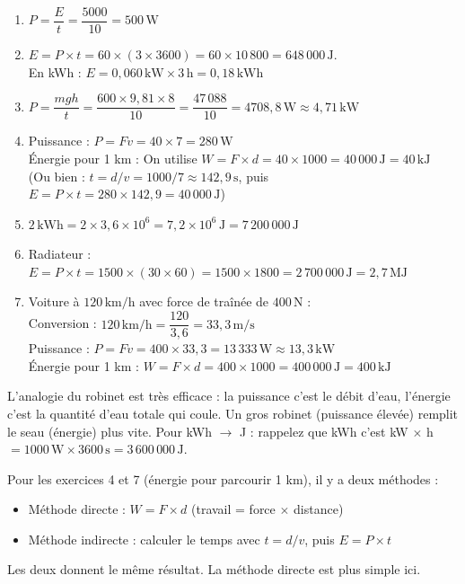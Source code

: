 \documentclass[11pt,a4paper]{article}
\newcommand{\corrbox}[1]{
\begin{tcolorbox}[colback=correctgreen!8!white,colframe=correctgreen!60!black]
#1
\end{tcolorbox}
}
\newcommand{\tipbox}[1]{
\begin{tcolorbox}[colback=tipblue!8!white,colframe=tipblue!60!black,title=\textbf{Comment expliquer}]
#1
\end{tcolorbox}
}
\begin{document}
\corrbox{
\begin{enumerate}
\item $P = \dfrac{E}{t} = \dfrac{5000}{10} = 500\,\text{W}$
\item $E = P \times t = 60 \times (3 \times 3600) = 60 \times 10\,800 = 648\,000\,\text{J}$. \\ En kWh : $E = 0{,}060\,\text{kW} \times 3\,\text{h} = 0{,}18\,\text{kWh}$
\item $P = \dfrac{mgh}{t} = \dfrac{600 \times 9{,}81 \times 8}{10} = \dfrac{47\,088}{10} = 4708{,}8\,\text{W} \approx 4{,}71\,\text{kW}$
\item Puissance : $P = Fv = 40 \times 7 = 280\,\text{W}$\\[0.2cm]
\'Energie pour 1 km : On utilise $W = F \times d = 40 \times 1000 = 40\,000\,\text{J} = 40\,\text{kJ}$\\[0.1cm]
(Ou bien : $t = d/v = 1000/7 \approx 142{,}9\,\text{s}$, puis $E = P \times t = 280 \times 142{,}9 = 40\,000\,\text{J}$)
\item $2\,\text{kWh} = 2 \times 3{,}6 \times 10^{6} = 7{,}2 \times 10^{6}\,\text{J} = 7\,200\,000\,\text{J}$
\item Radiateur : $E = P \times t = 1500 \times (30 \times 60) = 1500 \times 1800 = 2\,700\,000\,\text{J} = 2{,}7\,\text{MJ}$
\item[7.] Voiture \`a $120\,\text{km/h}$ avec force de tra\^in\'ee de $400\,\text{N}$ :\\[0.2cm]
Conversion : $120\,\text{km/h} = \dfrac{120}{3{,}6} = 33{,}3\,\text{m/s}$\\[0.2cm]
Puissance : $P = Fv = 400 \times 33{,}3 = 13\,333\,\text{W} \approx 13{,}3\,\text{kW}$\\[0.2cm]
\'Energie pour 1 km : $W = F \times d = 400 \times 1000 = 400\,000\,\text{J} = 400\,\text{kJ}$
\end{enumerate}
}

\tipbox{
L'analogie du robinet est tr\`es efficace : la puissance c'est le d\'ebit d'eau, l'\'energie c'est la quantit\'e d'eau totale qui coule. Un gros robinet (puissance \'elev\'ee) remplit le seau (\'energie) plus vite. Pour kWh $\rightarrow$ J : rappelez que kWh c'est kW $\times$ h $= 1000\,\text{W} \times 3600\,\text{s} = 3\,600\,000\,\text{J}$.

\vspace{0.2cm}
Pour les exercices 4 et 7 (\'energie pour parcourir 1 km), il y a deux m\'ethodes :
\begin{itemize}
\item M\'ethode directe : $W = F \times d$ (travail = force $\times$ distance)
\item M\'ethode indirecte : calculer le temps avec $t = d/v$, puis $E = P \times t$
\end{itemize}
Les deux donnent le m\^eme r\'esultat. La m\'ethode directe est plus simple ici.
}
\end{document}

